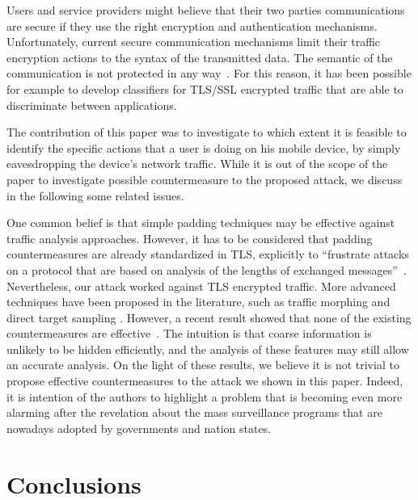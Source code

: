 \documentclass{acm_proc_article-sp}
\begin{document}
Users and service providers might believe that their two parties communications 
are secure if they use the right encryption and authentication mechanisms. 
Unfortunately, current secure communication mechanisms limit their 
traffic encryption actions to the syntax of the transmitted data. The semantic 
of the communication is not protected in any 
way~\cite{Krishnamurthy:2013:POS:2498345.2498600}. For this reason, it has been 
possible for example to develop classifiers for TLS/SSL encrypted traffic 
that are able to discriminate between applications. 


The contribution of this paper was to investigate to which extent it is feasible to identify the specific
actions that a user is doing on his mobile device, by simply eavesdropping the device's network traffic.
While it is out of the scope of the paper to investigate possible countermeasure to the proposed attack, we discuss in the following some related issues.

One common belief is that simple padding techniques may be effective against traffic analysis approaches. 
However, it has to be considered that padding countermeasures are already standardized in TLS, 
explicitly to ``frustrate attacks on a protocol that are based on
analysis of the lengths of exchanged messages''~\cite{rfc5246}. 
Nevertheless, our attack worked against TLS encrypted traffic.
More advanced techniques have been proposed in the literature, such as traffic morphing and direct target sampling \cite{conf/ndss/WrightCM09,Wright:2008:SMY:1397759.1398055}.
However, a recent result showed that none of the existing countermeasures are effective~\cite{Dyer:2012:PIS:2310656.2310689}.
The intuition is that coarse information is unlikely to be hidden efficiently, and the analysis of 
these features may still allow an accurate analysis. 
On the light of these results, we believe it is not trivial to propose effective countermeasures to the attack we shown in this paper.
Indeed, it is intention of the authors to highlight a problem that is becoming even more
alarming after the revelation about the mass surveillance programs that are nowadays
adopted by governments and nation states. 

\section{Conclusions}
\label{Conclusions}
\end{document}
